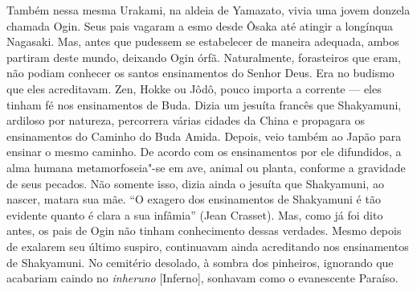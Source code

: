 Também nessa mesma Urakami, na aldeia de Yamazato, vivia uma jovem
donzela chamada Ogin. Seus pais  vagaram a esmo desde Ôsaka até atingir
a longínqua Nagasaki. Mas, antes que pudessem se estabelecer de maneira
adequada, ambos partiram deste mundo, deixando Ogin órfã. Naturalmente,
forasteiros que eram, não podiam conhecer os santos ensinamentos do
Senhor Deus. Era no budismo que eles acreditavam. Zen, Hokke ou Jôdô,
pouco importa a corrente --- eles tinham fé nos ensinamentos de Buda.
Dizia um jesuíta francês que Shakyamuni, 
ardiloso por natureza, percorrera várias cidades da China e propagara
os ensinamentos do Caminho do Buda Amida. Depois, veio também ao Japão
para ensinar o mesmo caminho. De acordo com os ensinamentos por ele
difundidos, a alma humana metamorfoseia"-se em ave, animal ou planta,
conforme a gravidade de seus pecados. Não somente isso, dizia ainda o
jesuíta que Shakyamuni, ao nascer, matara sua mãe. ``O exagero dos ensinamentos 
de Shakyamuni é tão evidente quanto é clara a sua infâmia'' (Jean Crasset). 
Mas, como já foi dito antes, os pais de Ogin não tinham conhecimento dessas
verdades. Mesmo depois de exalarem seu último suspiro, continuavam
ainda acreditando nos ensinamentos de Shakyamuni. No cemitério
desolado, à sombra dos pinheiros, ignorando que acabariam caindo no
\textit{inheruno} [Inferno], sonhavam como o evanescente Paraíso.

